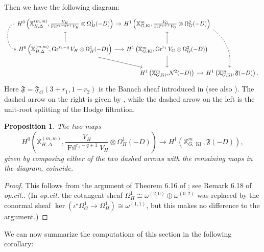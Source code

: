 \documentclass[cjm]{ipart}
\theoremstyle{plain}
\newtheorem{proposition}[theorem]{Proposition}
\theoremstyle{remark}
\DeclareMathOperator{\Fil}{Fil}
\DeclareMathOperator{\Gr}{Gr}
\DeclareMathOperator{\Kl}{Kl}
\newcommand{\cN}{\mathcal{N}}
\newcommand{\cX}{\mathcal{X}}
\numberwithin{equation}{subsection}
\begin{document}
   Then we have the following diagram:
   \[
    \begin{tikzcd}
    H^0\left(\mathbb{X}_{H, \Delta}^{(m,m)}, \frac{V_H}{\Fil^{r_1 - q + 1} V_H} \otimes \Omega^1_H(-D)\right)
    \rar  \arrow[dashed, bend right=90]{d}&[-1.5em]
    H^1\left(\mathbb{X}_{G, \Kl}^m, \frac{V_G}{\Fil^{r_1 + 1} V_G} \otimes \Omega^2_G(-D)\right)
    \arrow[dashed, bend left=30]{ddr}
    \\
    H^0\left(\mathbb{X}_{H, \Delta}^{(m,m)}, \Gr^{r_1-q} V_H \otimes \Omega^1_H(-D)\right)
    \rar \uar \arrow{rd} &
    H^1\left(\mathbb{X}_{G, \Kl}^m, \Gr^{r_1} V_G \otimes \Omega^2_G(-D)\right)
    \uar \dar \\
    &
    H^1\left(\mathbb{X}_{G, \Kl}^m, \cN^2(-D)\right)
    \rar &[-4em]
    H^1\left(\mathbb{X}_{G, \Kl}^m, \mathfrak{F}(-D)\right).
    \end{tikzcd}
   \]
   Here $\mathfrak{F} = \mathfrak{F}_G(3+r_1, 1-r_2)$ is the Banach sheaf introduced in \cite[\S 9]{pilloni20} (see also \cite[\S 3.2]{LPSZ1}). The dashed arrow on the right is given by \cite[Corollary 6.15]{LPSZ1}, while the dashed arrow on the left is the unit-root splitting of the Hodge filtration.

   \begin{proposition}
    The two maps
    \[ H^0\left(\mathbb{X}_{H, \Delta}^{(m,m)}, \frac{V_H}{\Fil^{r_1 - q + 1} V_H} \otimes \Omega^1_H(-D)\right)
    \longrightarrow
    H^1\left(\mathbb{X}_{G, \Kl}^m, \mathfrak{F}(-D)\right),\]
    given by composing either of the two dashed arrows with the remaining maps in the diagram, coincide.
   \end{proposition}

   \begin{proof}
    This follows from the argument of Theorem 6.16 of \cite{LPSZ1}; see Remark 6.18 of \emph{op.cit.}. (In \emph{op.cit.} the cotangent sheaf $\Omega^1_H \cong \omega^{(2, 0)} \oplus \omega^{(0, 2)}$ was replaced by the conormal sheaf $\ker(\iota^\star \Omega^1_G \to \Omega^1_H) \cong \omega^{(1, 1)}$, but this makes no difference to the argument.)
   \end{proof}

   We can now summarize the computations of this section in the following corollary:
\end{document}
